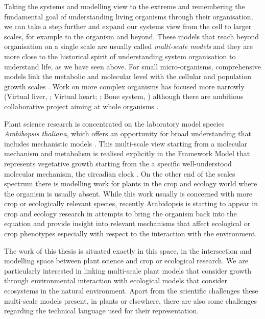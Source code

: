 Taking the systems and modelling view to the extreme and remembering the
fundamental goal of understanding living organisms through their organisation,
we can take a step further and expand our systems view from the cell to larger
scales, for example to the organism and beyond. These models that reach beyond
organisation on a single scale are usually called \emph{multi-scale models} and
they are more close to the historical spirit of understanding system
organisation to understand life, as we have seen above. For small
micro-organisms, comprehensive models link the metabolic and molecular level
with the cellular \citep{karr_whole-cell_2012} and population growth scales
\citep{weise_mechanistic_2015}. Work on more complex organisms has focused more
narrowly (Virtual liver, \citet{holzhutter2012virtual}; Virtual heart;
\citet{noble_modeling_2002}; Bone system, \citet{paoletti_multilevel_2012})
although there are ambitious collaborative project aiming at whole organisms
\citep[virtual rat, virtual human][]{beard_multiscale_2012, kohl_systems_2009}.

Plant science research is concentrated on the laboratory model species
\emph{Arabibopsis thaliana}, which offers an opportunity for broad understanding
that includes mechanistic models \citep{chew_mathematical_2014,
  voss_modelling_2014}. This multi-scale view starting from a molecular
mechanism and metabolism is realised explicitly in the Framework Model that
represents vegetative growth starting from the a specific well-understood
molecular mechanism, the circadian clock \citep[FMv1]{chew_multiscale_2014}. On
the other end of the scales spectrum there is modelling work for plants in the
crop and ecology world where the organism is usually absent. While this work
usually is concerned with more crop or ecologically relevant species, recently
Arabidopsis is starting to appear in crop and ecology research in attempts to
bring the organism back into the equation and provide insight into relevant
mechanisms that affect ecological or crop phenotypes especially with respect to
the interaction with the environment.

The work of this thesis is situated exactly in this space, in the intersection
and modelling space between plant science and crop or ecological
research. We are particularly interested in linking multi-scale plant models
that consider growth through environmental interaction with ecological models
that consider ecosystems in the natural environment.  Apart from the scientific
challenges these multi-scale models present, in plants or elsewhere, there are
also some challenges regarding the technical language used for their
representation.

